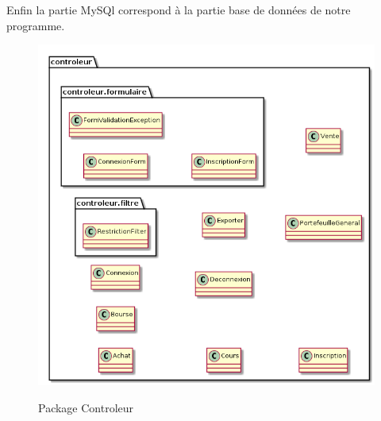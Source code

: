 Enfin la partie MySQl correspond à la partie base de données de notre programme.  

\begin{figure}[H]
  \center
  \includegraphics[scale=0.25]{../graph/packageControleur.png} \\
  \caption{Package Controleur}
\end{figure}

